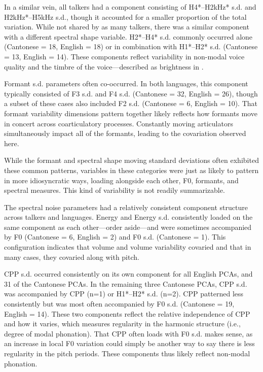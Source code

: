 In a similar vein, all talkers had a component consisting of H4*--H2kHz* s.d. and H2kHz*--H5kHz s.d., though it accounted for a smaller proportion of the total variation. While not shared by as many talkers, there was a similar component with a different spectral shape variable. H2*--H4* s.d. commonly occurred alone (Cantonese = 18, English = 18) or in combination with H1*--H2* s.d. (Cantonese = 13, English = 14). These components reflect variability in non-modal voice quality and the timbre of the voice---described as brightness in \citet{lee_2019_acoustic}. 

Formant s.d. parameters often co-occurred. In both languages, this component typically consisted of F3 s.d. and F4 s.d. (Cantonese = 32, English = 26), though a subset of these cases also included F2 s.d. (Cantonese = 6, English = 10). That formant variability dimensions pattern together likely reflects how formants move in concert across coarticulatory processes. Constantly moving articulators simultaneously impact all of the formants, leading to the covariation observed here. 

While the formant and spectral shape moving standard deviations often exhibited these common patterns, variables in these categories were just as likely to pattern in more idiosyncratic ways, loading alongside each other, F0, formants, and spectral measures. This kind of variability is not readily summarizable. 

The spectral noise parameters had a relatively consistent component structure across talkers and languages. Energy and Energy s.d. consistently loaded on the same component as each other---order aside---and were sometimes accompanied by F0 (Cantonese = 6, English = 2) and F0 s.d. (Cantonese = 1). This configuration indicates that volume and volume variability covaried and that in many cases, they covaried along with pitch.

CPP s.d. occurred consistently on its own component for all English PCAs, and 31 of the Cantonese PCAs. In the remaining three Cantonese PCAs, CPP s.d. was accompanied by CPP (n=1) or H1*--H2* s.d. (n=2). CPP patterned less consistently but was most often accompanied by F0 s.d. (Cantonese = 19, English = 14). These two components reflect the relative independence of CPP and how it varies, which measures regularity in the harmonic structure (i.e., degree of modal phonation). That CPP often loads with F0 s.d. makes sense, as an increase in local F0 variation could simply be another way to say there is less regularity in the pitch periods. These components thus likely reflect non-modal phonation.

